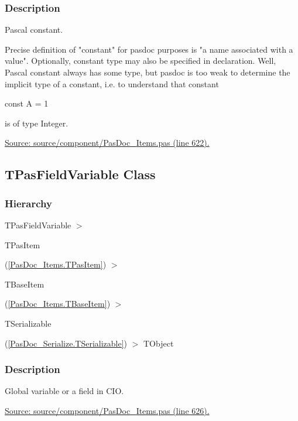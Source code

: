 \documentclass{report}
\newif\ifpdf
\begin{document}
\subsubsection*{\large{\textbf{Description}}\normalsize\hspace{1ex}\hfill}
Pascal constant.\hfill\vspace*{1ex}



Precise definition of "constant" for pasdoc purposes is "a name associated with a value". Optionally, constant type may also be specified in declaration. Well, Pascal constant always has some type, but pasdoc is too weak to determine the implicit type of a constant, i.e. to understand that constant \begin{ttfamily}const A = 1\end{ttfamily} is of type Integer.\par
\href{https://github.com/pasdoc/pasdoc/blob/master/source/component/PasDoc_Items.pas#L622}{Source: source/component/PasDoc{\_}Items.pas (line 622).}\ifpdf
\subsection*{\large{\textbf{TPasFieldVariable Class}}\normalsize\hspace{1ex}\hrulefill}
\else
\subsection*{TPasFieldVariable Class}
\fi
\label{PasDoc_Items.TPasFieldVariable}
\subsubsection*{\large{\textbf{Hierarchy}}\normalsize\hspace{1ex}\hfill}
TPasFieldVariable {$>$} \begin{ttfamily}TPasItem\end{ttfamily}(\ref{PasDoc_Items.TPasItem}) {$>$} \begin{ttfamily}TBaseItem\end{ttfamily}(\ref{PasDoc_Items.TBaseItem}) {$>$} \begin{ttfamily}TSerializable\end{ttfamily}(\ref{PasDoc_Serialize.TSerializable}) {$>$} 
TObject
\subsubsection*{\large{\textbf{Description}}\normalsize\hspace{1ex}\hfill}
Global variable or a field in CIO.\par
\href{https://github.com/pasdoc/pasdoc/blob/master/source/component/PasDoc_Items.pas#L626}{Source: source/component/PasDoc{\_}Items.pas (line 626).}\ifpdf
\end{document}
